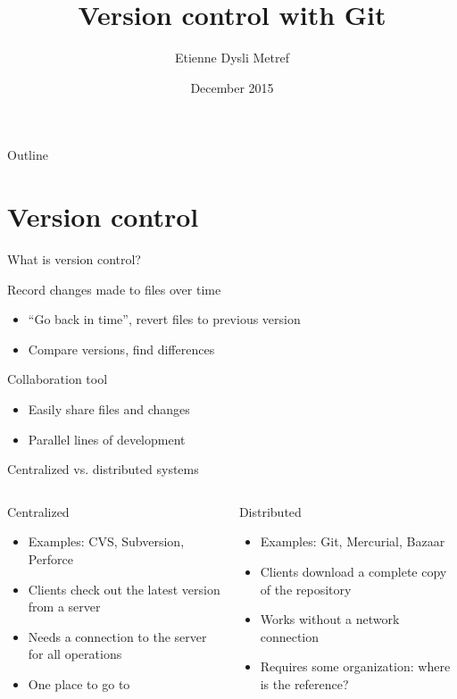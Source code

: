 \documentclass{beamer}
\title{Version control with Git}
\author{Etienne Dysli Metref}
\date{December 2015}
\begin{document}
\begin{frame}
  \titlepage
\end{frame}

\begin{frame}{Outline}
  \tableofcontents[hideallsubsections]
\end{frame}

\section{Version control}
\begin{frame}{What is version control?}
  \begin{block}{Record changes made to files over time}
    \begin{itemize}
    \item ``Go back in time'', revert files to previous version
    \item Compare versions, find differences
    \end{itemize}
  \end{block}
  \begin{block}{Collaboration tool}
    \begin{itemize}
    \item Easily share files and changes
    \item Parallel lines of development
    \end{itemize}
  \end{block}
\end{frame}

\begin{frame}{Centralized vs. distributed systems}
  \begin{columns}[t]
    \begin{column}{6cm}
      \begin{block}{Centralized}
        \begin{itemize}
        \item Examples: CVS, Subversion, Perforce
        \item Clients check out the latest version from a server
        \item Needs a connection to the server for all operations
        \item One place to go to
        \end{itemize}
      \end{block}
    \end{column}
    \begin{column}{6cm}
      \begin{block}{Distributed}
        \begin{itemize}
        \item Examples: Git, Mercurial, Bazaar
        \item Clients download a complete copy of the repository
        \item Works without a network connection
        \item Requires some organization: where is the reference?
        \end{itemize}
      \end{block}
    \end{column}
  \end{columns}
\end{frame}
\end{document}
